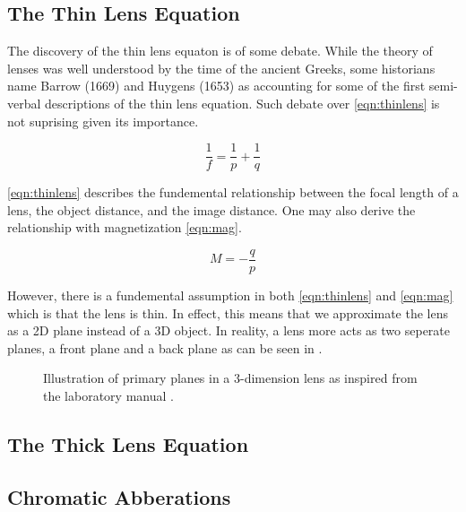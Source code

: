 \documentclass[aip, cp, amsmath, amssymb, reprint, nofootinbib]{revtex4-2}
\begin{document}
        \subsection{The Thin Lens Equation}

            The discovery of the thin lens equaton is of some debate. While the theory of lenses was well understood by the time of the ancient Greeks, some historians name Barrow (1669) and Huygens (1653) \cite{historyoptics} as accounting for some of the first semi-verbal descriptions of the thin lens equation. Such debate over \eqref{eqn:thinlens} is not suprising given its importance.

            \begin{equation} \label{eqn:thinlens}
                \frac{1}{f} = \frac{1}{p} + \frac{1}{q}
            \end{equation}

            \eqref{eqn:thinlens} describes the fundemental relationship between the focal length of a lens, the object distance, and the image distance. One may also derive the relationship with magnetization \eqref{eqn:mag}.

            \begin{equation} \label{eqn:mag}
                M = -\frac{q}{p}
            \end{equation}

            However, there is a fundemental assumption in both \eqref{eqn:thinlens} and \eqref{eqn:mag} which is that the lens is thin. In effect, this means that we approximate the lens as a 2D plane instead of a 3D object. In reality, a lens more acts as two seperate planes, a front plane and a back plane as can be seen in .

            \begin{figure}[H]
                
                \caption{Illustration of primary planes in a 3-dimension lens as inspired from the laboratory manual \cite{labmanual}.}
                \label{fig:real-lens}
            \end{figure}

        \subsection{The Thick Lens Equation}



        \subsection{Chromatic Abberations}
\end{document}

